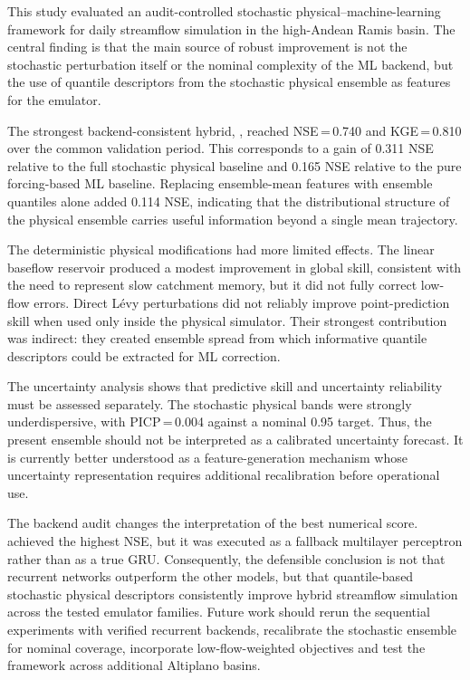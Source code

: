 \documentclass[a4paper,fleqn]{cas-sc}
\newcommand{\modelid}[1]{\begingroup\urlstyle{same}\path{#1}\endgroup}
\begin{document}
This study evaluated an audit-controlled stochastic physical--machine-learning framework for daily streamflow simulation in the high-Andean Ramis basin. The central finding is that the main source of robust improvement is not the stochastic perturbation itself or the
nominal complexity of the ML backend, but the use of quantile descriptors from the stochastic physical ensemble as features for the emulator.

The strongest backend-consistent hybrid, \modelid{E6_HYB_XGB_QUANTILES}, reached NSE\,=\,0.740 and KGE\,=\,0.810 over the common validation period. This corresponds to a gain of 0.311 NSE relative to the full stochastic physical baseline and 0.165 NSE relative to the pure forcing-based ML baseline. Replacing ensemble-mean features with ensemble quantiles alone added 0.114 NSE, indicating that the distributional structure of the physical ensemble carries useful information beyond a single mean trajectory.

The deterministic physical modifications had more limited effects. The linear baseflow reservoir produced a modest improvement in global skill, consistent with the need to represent slow catchment memory, but it did not fully correct low-flow errors. Direct L\'{e}vy perturbations did not reliably improve point-prediction skill when used only inside the
physical simulator. Their strongest contribution was indirect: they created ensemble spread from which informative quantile descriptors could be extracted for ML correction.

The uncertainty analysis shows that predictive skill and uncertainty reliability must be assessed separately. The stochastic physical bands were strongly underdispersive, with PICP\,=\,0.004 against a nominal 0.95 target. Thus, the present ensemble should not be interpreted as a calibrated uncertainty forecast. It is currently better understood as a feature-generation mechanism whose uncertainty representation requires additional recalibration before operational use.

The backend audit changes the interpretation of the best numerical score. \modelid{E8_HYB_GRU_QUANTILES} achieved the highest NSE, but it was executed as a fallback multilayer perceptron rather than as a true GRU. Consequently, the defensible conclusion is not that recurrent networks outperform the other models, but that quantile-based stochastic
physical descriptors consistently improve hybrid streamflow simulation across the tested emulator families. Future work should rerun the sequential experiments with verified recurrent backends, recalibrate the stochastic ensemble for nominal coverage, incorporate low-flow-weighted objectives and test the framework across additional Altiplano basins.
\end{document}
